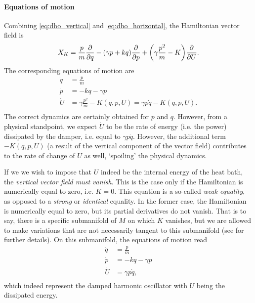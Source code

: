 \paragraph{Equations of motion} Combining \cref{eq:dho_vertical} and \cref{eq:dho_horizontal}, the Hamiltonian vector field is
\begin{equation}
     X_K = \frac{p}{m}\pdv{}{q} - (\gamma p + kq)\pdv{}{p} + \qty(\gamma \frac{p^2}{m} - K)\pdv{}{U}.
\end{equation}
The corresponding equations of motion are 
\begin{equation}
    \begin{split}
        \dot{q} &= \frac{p}{m} \\
        \dot{p} &= -kq -\gamma p \\
        \dot{U} &= \gamma \frac{p^2}{m} - K(q, p, U) = \gamma p\dot{q} - K(q, p, U). \\
    \end{split}
\end{equation}
The correct dynamics are certainly obtained for \(p\) and \(q\). However, from a physical standpoint, we expect \(\dot{U}\) to be the rate of energy (i.e. the power) dissipated by the damper, i.e. equal to \(\gamma p \dot{q}\). However, the additional term \(-K(q, p, U)\) (a result of the vertical component of the vector field) contributes to the rate of change of \(U\) as well, `spoiling' the physical dynamics.

If we we wish to impose that \(U\) indeed be the internal energy of the heat bath, the \emph{vertical vector field must vanish}. This is the case only if the Hamiltonian is numerically equal to zero, i.e. \(K = 0\). This equation is a so-called \emph{weak equality}, as opposed to a \emph{strong} or \emph{identical} equality. In the former case, the Hamiltonian is numerically equal to zero, but its partial derivatives do not vanish. That is to say, there is a specific submanifold of \(M\) on which \(K\) vanishes, but we are allowed to make variations that are not necessarily tangent to this submanifold (see \citet{Dirac1950} for further details). On this submanifold, the equations of motion read
\begin{equation}
    \begin{split}
        \dot{q} &= \frac{p}{m} \\
        \dot{p} &= -kq -\gamma p \\
        \dot{U} &= \gamma p\dot{q},\\
    \end{split}
\end{equation}
which indeed represent the damped harmonic oscillator with \(U\) being the dissipated energy.

